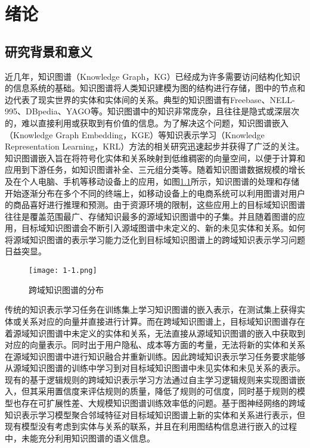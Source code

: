 \chapter{绪论}

\section{研究背景和意义}
近几年，知识图谱（Knowledge Graph，KG）已经成为许多需要访问结构化知识的信息系统的基础\cite{zou2020survey}。知识图谱将人类知识建模为图的结构进行存储，图中的节点和边代表了现实世界的实体和实体间的关系。典型的知识图谱有Freebase\cite{bollacker2008freebase}、NELL-995\cite{xiong2017deeppath}、DBpedia\cite{bizer2009dbpedia}、YAGO\cite{suchanek2007yago}等。知识图谱中的知识非常庞杂，且往往是隐式或深层次的，难以直接利用或获取到有价值的信息。为了解决这个问题，知识图谱嵌入（Knowledge Graph Embedding，KGE）等知识表示学习（Knowledge Representation Learning，KRL）方法的相关研究迅速起步并获得了广泛的关注。知识图谱嵌入旨在将符号化实体和关系映射到低维稠密的向量空间，以便于计算和应用到下游任务，如知识图谱补全、三元组分类等\cite{2021-eh}。随着知识图谱数据规模的增长及在个人电脑、手机等移动设备上的应用，如图\ref{fig:1-1}所示，知识图谱的处理和存储开始逐渐分布在多个不同的终端上，如移动设备上的电商系统可以利用图谱对用户的商品喜好进行推理和预测。由于资源环境的限制，这些应用上的目标域知识图谱往往是覆盖范围最广、存储知识最多的源域知识图谱中的子集。并且随着图谱的应用，目标域知识图谱会不断引入源域图谱中未定义的、新的未见实体和关系。如何将源域知识图谱的表示学习能力泛化到目标域知识图谱上的跨域知识表示学习问题日益突显。
\begin{figure}[h]
  \centering
  \texttt{[image: 1-1.png]}
  \caption{跨域知识图谱的分布}
  \label{fig:1-1}
\end{figure}

传统的知识表示学习任务在训练集上学习知识图谱的嵌入表示，在测试集上获得实体或关系对应的向量并直接进行计算。而在跨域知识图谱上，目标域知识图谱存在着源域知识图谱中未定义的实体和关系，无法直接从源域知识图谱的嵌入中获取到对应的向量表示。同时出于用户隐私、成本等方面的考量，无法将新的实体和关系在源域知识图谱中进行知识融合并重新训练。因此跨域知识表示学习任务要求能够从源域知识图谱的训练中学习到对目标域知识图谱中未见实体和未见关系的表示。现有的基于逻辑规则的跨域知识表示学习方法通过自主学习逻辑规则来实现图谱嵌入，但其采用置信度来评估规则的质量，降低了规则的可信度，同时基于规则的模型也存在可扩展性差、大规模知识图谱训练效率低的问题。基于图神经网络的跨域知识表示学习模型聚合邻域特征对目标域知识图谱上新的实体和关系进行表示，但现有模型没有考虑到实体与关系的联系，并且在利用图结构信息进行嵌入的过程中，未能充分利用知识图谱的语义信息。

